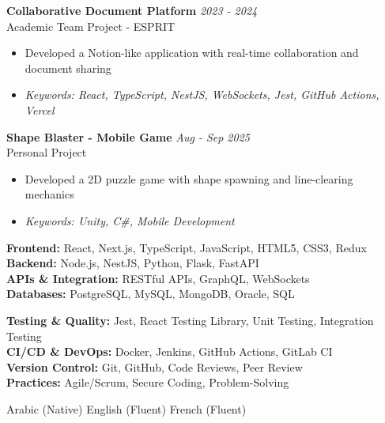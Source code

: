 \documentclass[11pt,a4paper]{article}
\begin{document}

\textbf{Collaborative Document Platform} \hfill \textit{2023 - 2024}\\[-2pt]
Academic Team Project - ESPRIT\\[-5pt]
\begin{itemize}[leftmargin=8pt,itemsep=1pt,topsep=2pt]
  \item Developed a Notion-like application with real-time collaboration and document sharing
  \item[] \textit{\footnotesize Keywords: React, TypeScript, NestJS, WebSockets, Jest, GitHub Actions, Vercel}
\end{itemize}\vspace{3pt}

\textbf{Shape Blaster - Mobile Game} \hfill \textit{Aug - Sep 2025}\\[-2pt]
Personal Project\\[-5pt]
\begin{itemize}[leftmargin=8pt,itemsep=1pt,topsep=2pt]
  \item Developed a 2D puzzle game with shape spawning and line-clearing mechanics
  \item[] \textit{\footnotesize Keywords: Unity, C\#, Mobile Development}
\end{itemize}\vspace{3pt}

{\small
\begin{minipage}[t]{0.48\textwidth}
  \textbf{Frontend:} React, Next.js, TypeScript, JavaScript, HTML5, CSS3, Redux\\[1.5pt]
  \textbf{Backend:} Node.js, NestJS, Python, Flask, FastAPI\\[1.5pt]
  \textbf{APIs \& Integration:} RESTful APIs, GraphQL, WebSockets\\[1.5pt]
  \textbf{Databases:} PostgreSQL, MySQL, MongoDB, Oracle, SQL
\end{minipage}
\hfill
\begin{minipage}[t]{0.48\textwidth}
  \textbf{Testing \& Quality:} Jest, React Testing Library, Unit Testing, Integration Testing\\[1.5pt]
  \textbf{CI/CD \& DevOps:} Docker, Jenkins, GitHub Actions, GitLab CI\\[1.5pt]
  \textbf{Version Control:} Git, GitHub, Code Reviews, Peer Review\\[1.5pt]
  \textbf{Practices:} Agile/Scrum, Secure Coding, Problem-Solving
\end{minipage}
}

Arabic (Native) \textbar{} English (Fluent) \textbar{} French (Fluent)

\end{document}
